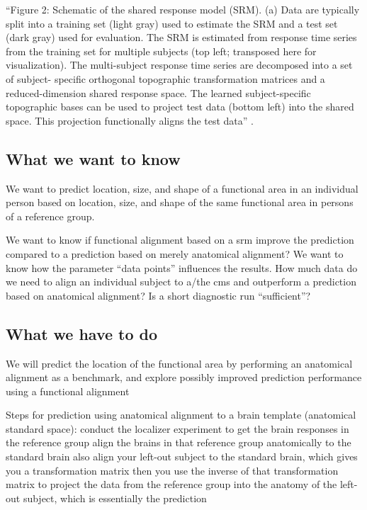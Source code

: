 ``Figure 2: Schematic of the shared response model (SRM). (a) Data are typically
split into a training set (light gray) used to estimate the SRM and a test set
(dark gray) used for evaluation. The SRM is estimated from response time series
from the training set for multiple subjects (top left; transposed here for
visualization). The multi-subject response time series are decomposed into a set
of subject- specific orthogonal topographic transformation matrices and a
reduced-dimension shared response space. The learned subject-specific
topographic bases can be used to project test data (bottom left) into the shared
space. This projection functionally aligns the test data''
\citep{kumar2020brainiak}.

\citep{chen2015reduced}


\subsection{What we want to know}
We want to predict location, size, and shape of a functional area in
an individual person based on location, size, and shape of the same functional
area in persons of a reference group.

%
We want to know if functional alignment based on a \ac{srm} improve the
prediction compared to a prediction based on merely anatomical alignment?
%
We want to know how the parameter ``data points'' influences the results.
%
How much data do we need to align an individual subject to a/the \ac{cms} and
outperform a prediction based on anatomical alignment?
%
Is a short diagnostic run ``sufficient''?

\subsection{What we have to do}

We will predict the location of the functional area by performing an
anatomical alignment as a benchmark, and explore possibly improved prediction
performance using a functional alignment

Steps for prediction using anatomical alignment to a brain template (anatomical
standard space):
%
conduct the localizer experiment to get the brain responses in the reference
group
%
align the brains in that reference group anatomically to the standard brain
%
also align your left-out subject to the standard brain, which gives you a
transformation matrix
%
then you use the inverse of that transformation matrix to project the data
%
from the reference group into the anatomy of the left-out subject, which is
essentially the prediction

